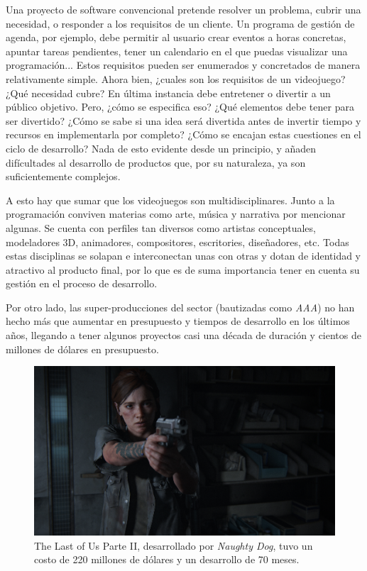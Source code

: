 Una proyecto de software convencional pretende resolver un problema, cubrir una necesidad, o responder a los requisitos de un cliente. Un programa de gestión de agenda, por ejemplo, debe permitir al usuario crear eventos a horas concretas, apuntar tareas pendientes, tener un calendario en el que puedas visualizar una programación... Estos requisitos pueden ser enumerados y concretados de manera relativamente simple. Ahora bien, ¿cuales son los requisitos de un videojuego? ¿Qué necesidad cubre? En última instancia debe entretener o divertir a un público objetivo. Pero, ¿cómo se especifica eso? ¿Qué elementos debe tener para ser divertido? ¿Cómo se sabe si una idea será divertida antes de invertir tiempo y recursos en implementarla por completo? ¿Cómo se encajan estas cuestiones en el ciclo de desarrollo? Nada de esto evidente desde un principio, y añaden difícultades al desarrollo de productos que, por su naturaleza, ya son suficientemente complejos.

A esto hay que sumar que los videojuegos son multidisciplinares. Junto a la programación conviven materias como arte, música y narrativa por mencionar algunas. Se cuenta con perfiles tan diversos como artistas conceptuales, modeladores 3D, animadores, compositores, escritories, diseñadores, etc. Todas estas disciplinas se solapan e interconectan unas con otras y dotan de identidad y atractivo al producto final, por lo que es de suma importancia tener en cuenta su gestión en el proceso de desarrollo.

Por otro lado, las super-producciones del sector (bautizadas como \textit{AAA}) no han hecho más que aumentar en presupuesto y tiempos de desarrollo en los últimos años, llegando a tener algunos proyectos casi una década de duración y cientos de millones de dólares en presupuesto.

\begin{figure}[h]
    \centering
    \includegraphics[scale=0.15]{img/tlou.jpg}
    \caption[The Last of Us Parte II]{The Last of Us Parte II, desarrollado por \textit{Naughty Dog}, tuvo un costo de 220 millones de dólares y un desarrollo de 70 meses.}
    \label{fig:tlou2}
\end{figure}

